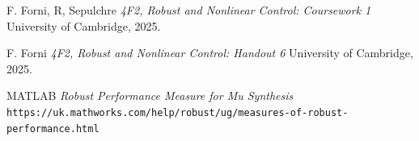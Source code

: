 \documentclass{article}
\begin{document}
\begin{thebibliography}{9}

    
      F. Forni, R, Sepulchre
      \emph{4F2, Robust and Nonlinear Control: Coursework 1}
      University of Cambridge,
      2025.

      F. Forni
      \emph{4F2, Robust and Nonlinear Control: Handout 6}
      University of Cambridge,
      2025.
    
      MATLAB
      \emph{Robust Performance Measure for Mu Synthesis}
      \texttt{https://uk.mathworks.com/help/robust/ug/measures-of-robust-performance.html}

    
\end{thebibliography}
\end{document}
